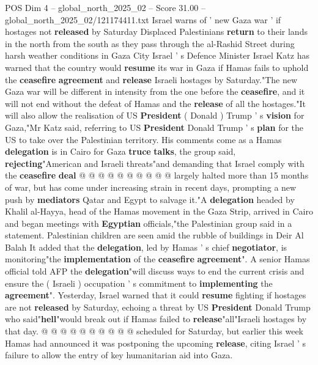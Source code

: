 \begin{textsample}{POS Dim 4 – global\_north\_2025\_02 – Score 31.00 – global\_north\_2025\_02/121174411.txt}  \label{ex:f4_pos_057}
Israel warns of ' new Gaza war ' if hostages not \textbf{released} by Saturday Displaced Palestinians \textbf{return} to their lands in the north from the south as they pass through the al-Rashid Street during harsh weather conditions in Gaza City Israel ' s Defence Minister Israel Katz has warned that the country would \textbf{resume} its war in Gaza if Hamas fails to uphold the \textbf{ceasefire} \textbf{agreement} and \textbf{release} Israeli hostages by Saturday."The new Gaza war will be different in intensity from the one before the \textbf{ceasefire}, and it will not end without the defeat of Hamas and the \textbf{release} of all the hostages."It will also allow the realisation of US \textbf{President} ( Donald ) Trump ' s \textbf{vision} for Gaza,"Mr Katz said, referring to US \textbf{President} Donald Trump ' s \textbf{plan} for the US to take over the Palestinian territory.
His comments come as a Hamas \textbf{delegation} is in Cairo for Gaza \textbf{truce} \textbf{talks}, the group said, \textbf{rejecting}"American and Israeli threats"and demanding that Israel comply with the \textbf{ceasefire} \textbf{deal} @ @ @ @ @ @ @ @ @ @ largely halted more than 15 months of war, but has come under increasing strain in recent days, prompting a new push by \textbf{mediators} Qatar and Egypt to salvage it."A \textbf{delegation} headed by Khalil al-Hayya, head of the Hamas movement in the Gaza Strip, arrived in Cairo and began meetings with \textbf{Egyptian} officials,"the Palestinian group said in a statement.
Palestinian children are seen amid the rubble of buildings in Deir Al Balah It added that the \textbf{delegation}, led by Hamas ' s chief \textbf{negotiator}, is monitoring"the \textbf{implementation} of the \textbf{ceasefire} \textbf{agreement}".
A senior Hamas official told AFP the \textbf{delegation}"will discuss ways to end the current crisis and ensure the ( Israeli ) occupation ' s commitment to \textbf{implementing} the \textbf{agreement}".
Yesterday, Israel warned that it could \textbf{resume} fighting if hostages are not \textbf{released} by Saturday, echoing a threat by US \textbf{President} Donald Trump who said"\textbf{hell}"would break out if Hamas failed to \textbf{release}"all"Israeli hostages by that day. @ @ @ @ @ @ @ @ @ @ scheduled for Saturday, but earlier this week Hamas had announced it was postponing the upcoming \textbf{release}, citing Israel ' s failure to allow the entry of key humanitarian aid into Gaza.

\end{textsample}
